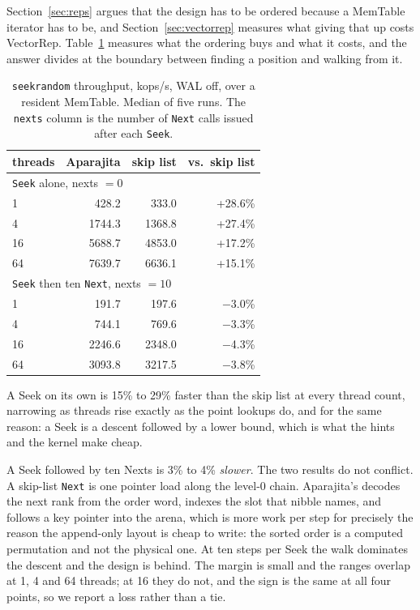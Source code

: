 \documentclass[conference]{IEEEtran}
\begin{document}
Section~\ref{sec:reps} argues that the design has to be ordered because a MemTable
iterator has to be, and Section~\ref{sec:vectorrep} measures what giving that up
costs VectorRep. Table~\ref{tab:seeks} measures what the ordering buys
and what it costs, and the answer divides at the boundary between finding a
position and walking from it.

\begin{table}[t]
\caption{\texttt{seekrandom} throughput, kops/s, WAL off, over a resident MemTable.
         Median of five runs. The \texttt{nexts} column is the number of \texttt{Next} calls
         issued after each \texttt{Seek}.}
\label{tab:seeks}
\centering\footnotesize\setlength{\tabcolsep}{4pt}
\begin{tabular}{lrrr}
\toprule
threads & Aparajita & skip list & vs.\ skip list \\
\midrule
\multicolumn{4}{l}{\texttt{Seek} alone, nexts $= 0$} \\
1  &  428.2 &  333.0 & +28.6\% \\
4  & 1744.3 & 1368.8 & +27.4\% \\
16 & 5688.7 & 4853.0 & +17.2\% \\
64 & 7639.7 & 6636.1 & +15.1\% \\
\midrule
\multicolumn{4}{l}{\texttt{Seek} then ten \texttt{Next}, nexts $= 10$} \\
1  &  191.7 &  197.6 & $-$3.0\% \\
4  &  744.1 &  769.6 & $-$3.3\% \\
16 & 2246.6 & 2348.0 & $-$4.3\% \\
64 & 3093.8 & 3217.5 & $-$3.8\% \\
\bottomrule
\end{tabular}
\end{table}

A Seek on its own is 15\% to 29\% faster than the skip list at every thread count,
narrowing as threads rise exactly as the point lookups do, and for the same reason:
a Seek is a descent followed by a lower bound, which is what the hints and the
kernel make cheap.

A Seek followed by ten Nexts is 3\% to 4\% \emph{slower}. The two results do not
conflict. A skip-list \texttt{Next} is one pointer load along the level-0 chain.
Aparajita's decodes the next rank from the order word, indexes the slot that nibble
names, and follows a key pointer into the arena, which is more work per step for
precisely the reason the append-only layout is cheap to write: the sorted order is
a computed permutation and not the physical one. At ten steps per Seek the walk
dominates the descent and the design is behind. The margin is small and the ranges
overlap at 1, 4 and 64 threads; at 16 they do not, and the sign is the same at all
four points, so we report a loss rather than a tie.
\end{document}
